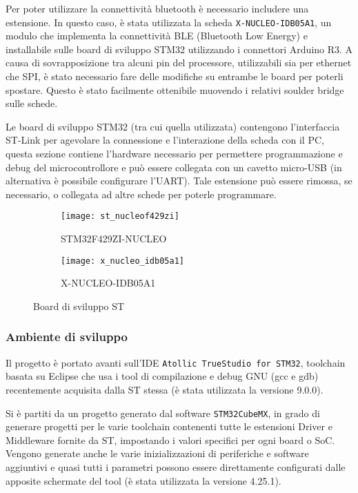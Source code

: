 Per poter utilizzare la connettivit\`a bluetooth \`e necessario includere una estensione. In questo caso, \`e stata utilizzata la scheda \texttt{X-NUCLEO-IDB05A1}, un modulo che implementa la connettivit\`a BLE (Bluetooth Low Energy) e installabile sulle board di sviluppo STM32 utilizzando i connettori Arduino R3. A causa di sovrapposizione tra alcuni pin del processore, utilizzabili sia per ethernet che SPI, \`e stato necessario fare delle modifiche su entrambe le board per poterli spostare. Questo \`e stato facilmente ottenibile muovendo i relativi soulder bridge sulle schede.

Le board di sviluppo STM32 (tra cui quella utilizzata) contengono l'interfaccia ST-Link per agevolare la connessione e l'interazione della scheda con il PC, questa sezione contiene l'hardware necessario per permettere programmazione e debug del microcontrollore e pu\`o essere collegata con un cavetto micro-USB (in alternativa \`e possibile configurare l'UART). Tale estensione pu\`o essere rimossa, se necessario, o collegata ad altre schede per poterle programmare.

\begin{figure}[ht]
  \center
  \begin{subfigure}{.45\textwidth}
    \texttt{[image: st\_nucleof429zi]}
    \caption{STM32F429ZI-NUCLEO}
  \end{subfigure}
  \hfill
  \begin{subfigure}{.45\textwidth}
    \texttt{[image: x\_nucleo\_idb05a1]}
    \caption{X-NUCLEO-IDB05A1}
  \end{subfigure}
  \caption{Board di sviluppo ST}
  \label{fig:boards}
\end{figure}

\subsubsection{Ambiente di sviluppo}

Il progetto \`e portato avanti sull'IDE \texttt{Atollic TrueStudio for STM32}, toolchain basata su Eclipse che usa i tool di compilazione e debug GNU (gcc e gdb) recentemente acquisita dalla ST stessa (\`e stata utilizzata la versione 9.0.0).

Si \`e partiti da un progetto generato dal software \texttt{STM32CubeMX}, in grado di generare progetti per le varie toolchain contenenti tutte le estensioni Driver e Middleware fornite da ST, impostando i valori specifici per ogni board o SoC. Vengono generate anche le varie inizializzazioni di periferiche e software aggiuntivi e quasi tutti i parametri possono essere direttamente configurati dalle apposite schermate del tool (\`e stata utilizzata la versione 4.25.1).

